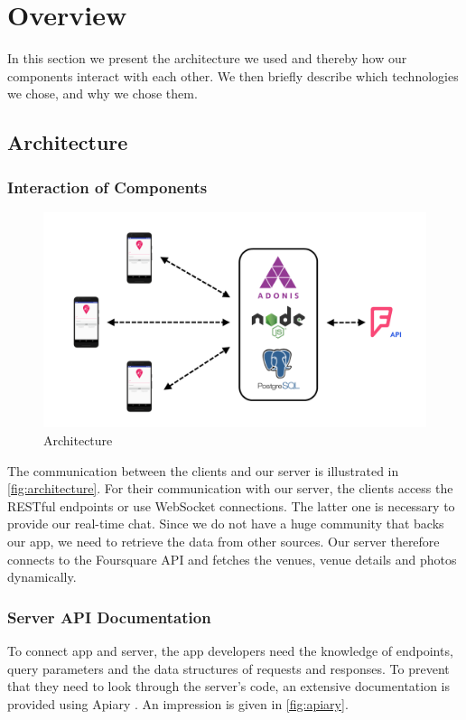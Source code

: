\documentclass[11pt, accentcolor=tud1c]{tudreport}
\begin{document}
\chapter{Overview}\label{ch:overview}
In this section we present the architecture we used and thereby how our components interact with each other. We then briefly describe which technologies we chose, and why we chose them.
\section{Architecture}\label{sec:architecture}
\subsection{Interaction of Components}
\begin{figure}[ht]
	\includegraphics[width=\textwidth]{./res/architecture.png}
	\caption{Architecture}
	\label{fig:architecture}
\end{figure}
The communication between the clients and our server is illustrated in \autoref{fig:architecture}.
For their communication with our server, the clients access the RESTful endpoints or use WebSocket connections. The latter one is necessary to provide our real-time chat. Since we do not have a huge community that backs our app, we need to retrieve the data from other sources. Our server therefore connects to the Foursquare API and fetches the venues, venue details and photos dynamically.
\clearpage
\subsection{Server API Documentation}
To connect app and server, the app developers need the knowledge of endpoints, query parameters and the data structures of requests and responses. To prevent that they need to look through the server's code, an extensive documentation is provided using Apiary \cite{apiary}. An impression is given in \autoref{fig:apiary}.
\end{document}
